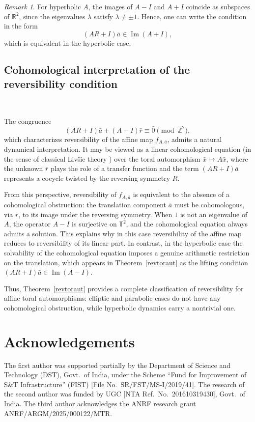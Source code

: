 \documentclass[12pt]{amsart}
\theoremstyle{plain}
\theoremstyle{definition}
\theoremstyle{remark}
\newtheorem{remark}{Remark}
\begin{document}
\begin{remark} For hyperbolic $A$, the images of $A-I$ and $A+I$ coincide as subspaces of $\mathbb{R}^2$, since the eigenvalues $\lambda$ satisfy $\lambda \neq \pm 1$.  
Hence, one can write the condition in the form
$$
(AR+I)\overline{a} \in \operatorname{Im}(A+I),
$$
which is equivalent in the hyperbolic case. 
\end{remark}
\subsection{Cohomological interpretation of the reversibility condition}\label{coho}  \;\

\medskip The congruence
\[
(AR+I)\bar{a} + (A-I)\bar{r} \equiv \bar{0} \pmod{\mathbb{Z}^2},
\]
which characterizes reversibility of the affine map $f_{A,\bar{a}}$, admits a natural
dynamical interpretation. It may be viewed as a linear cohomological equation (in the sense of classical Livšic theory \cite{L})
over the toral automorphism $\bar{x} \mapsto A\bar{x}$, where the unknown $\bar{r}$ plays the role
of a transfer function and the term $(AR+I)\bar{a}$ represents a cocycle twisted by
the reversing symmetry $R$.

From this perspective, reversibility of $f_{A,\bar{a}}$ is equivalent to the absence of a cohomological obstruction: the translation component $\bar{a}$ must be cohomologous, via $\bar{r}$, to its image under the reversing symmetry. When $1$ is not an eigenvalue of $A$, the operator $A-I$ is surjective on $\mathbb{T}^2$, and the cohomological equation always admits a solution. This explains why in this case reversibility of the affine map reduces to reversibility of its linear part. In contrast, in the hyperbolic case the solvability of the cohomological equation imposes a genuine arithmetic restriction on the translation, which appears in Theorem~\ref{revtoraut} as the lifting condition
$(AR+I) \bar a \in \operatorname{Im}(A-I)$.

Thus, Theorem~\ref{revtoraut} provides a complete classification of
reversibility for affine toral automorphisms: elliptic and parabolic cases
do not have any cohomological obstruction, while hyperbolic dynamics carry a 
nontrivial one.

\section*{Acknowledgements}

The first author was supported partially by the Department of Science and Technology (DST), Govt.~of India, under the Scheme “Fund for Improvement of S\&T Infrastructure” (FIST) [File No.~SR/FST/MS-I/2019/41]. The research of the second author was funded by UGC [NTA Ref.~No.~201610319430], Govt.~of India. The third author acknowledges the ANRF  research grant ANRF/ARGM/2025/000122/MTR. 
\end{document}
